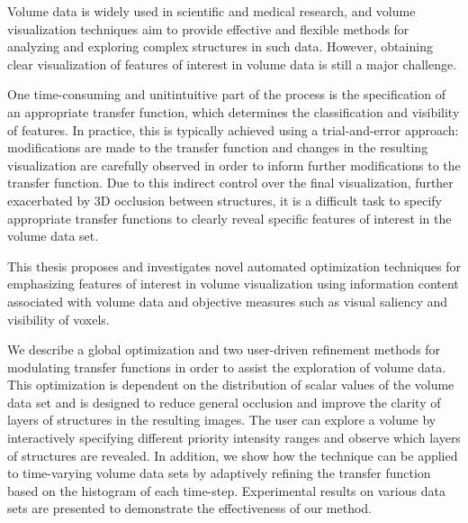 \documentclass[a4paper, 12pt, oneside]{report}         %
\begin{document}
\begin{thesisabstract}
	
Volume data is widely used in scientific and medical research, and volume visualization techniques aim to provide effective and flexible methods for analyzing and exploring complex structures in such data. However, obtaining clear visualization of features of interest in volume data is still a major challenge.

One time-consuming and unitintuitive part of the process is the specification of an appropriate transfer function, which determines the classification and visibility of features. In practice, this is typically achieved using a trial-and-error approach: modifications are made to the transfer function and changes in the resulting visualization are carefully observed in order to inform further modifications to the transfer function. Due to this indirect control over the final visualization, further exacerbated by 3D occlusion between structures, it is a difficult task to specify appropriate transfer functions to clearly reveal specific features of interest in the volume data set.

This thesis proposes and investigates novel automated optimization techniques for emphasizing features of interest in volume visualization using information content associated with volume data and objective measures such as visual saliency and visibility of voxels.

We describe a global optimization and two user-driven refinement methods for modulating transfer functions in order to assist the exploration of volume data.
This optimization is dependent on the distribution of scalar values of the volume data set and is designed to reduce general occlusion and improve the clarity of layers of structures in the resulting images.
The user can explore a volume by interactively specifying different priority intensity ranges and observe which layers of structures are revealed. In addition, we show how the technique can be applied to time-varying volume data sets by adaptively refining the transfer function based on the histogram of each time-step. 
Experimental results on various data sets are presented to demonstrate the effectiveness of our method.


\end{thesisabstract}
\end{document}
